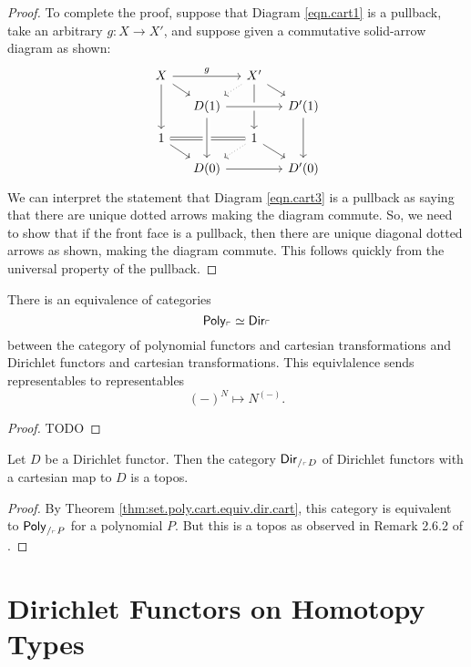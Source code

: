 \begin{proof}
To complete the proof, suppose that Diagram \ref{eqn.cart1} is a pullback, take an arbitrary $g\colon X\to X'$, and suppose given a commutative solid-arrow diagram as shown:
\[
\begin{tikzcd}[sep=small]
  X\ar[rr, "g"]\ar[dd]\ar[rd]&&
  X'\ar[dr]\ar[dd]\ar[dl, dotted]\\&
  D(1)\ar[rr, crossing over]&&
  D'(1)\ar[dd]\\
  1\ar[dr]\ar[rr, equal]&&
  1\ar[dr]\ar[dl, dotted]\\&
  D(0)\ar[from=uu, crossing over]\ar[rr]&&
  D'(0)
\end{tikzcd}
\]
We can interpret the statement that Diagram \ref{eqn.cart3} is a pullback as
saying that there are unique dotted arrows making the diagram commute. So, we need to show that if the front face is a pullback, then there are unique diagonal dotted arrows as shown, making the diagram commute. This follows quickly from the universal property of the pullback.
\end{proof}

\begin{thm}\label{thm:set.poly.cart.equiv.dir.cart}
  There is an equivalence of categories
  $$\mathsf{{Poly}}_{\ulcorner} \simeq \operatorname{\mathsf{{Dir}}}_{\ulcorner}$$
  between the category of polynomial functors and cartesian transformations and
  Dirichlet functors and cartesian transformations. This equivlalence sends
  representables to representables
  $$(-)^N \mapsto N^{(-)}.$$
\end{thm}
\begin{proof}
TODO
\end{proof}

\begin{cor}
  Let $D$ be a Dirichlet functor. Then the category
  $\operatorname{\mathsf{{Dir}}}_{/_{\ulcorner} D}$
  of Dirichlet functors with a cartesian map to $D$ is a topos.
\end{cor}
\begin{proof}
By Theorem \ref{thm:set.poly.cart.equiv.dir.cart}, this category is equivalent
to $\mathsf{{Poly}}_{/_{\ulcorner} P}$ for a polynomial $P$. But this is a topos as
observed in Remark 2.6.2 of \cite{GHK:Analytic.Monads}.
\end{proof}

\section{Dirichlet Functors on Homotopy Types} \label{sec:type.level}

